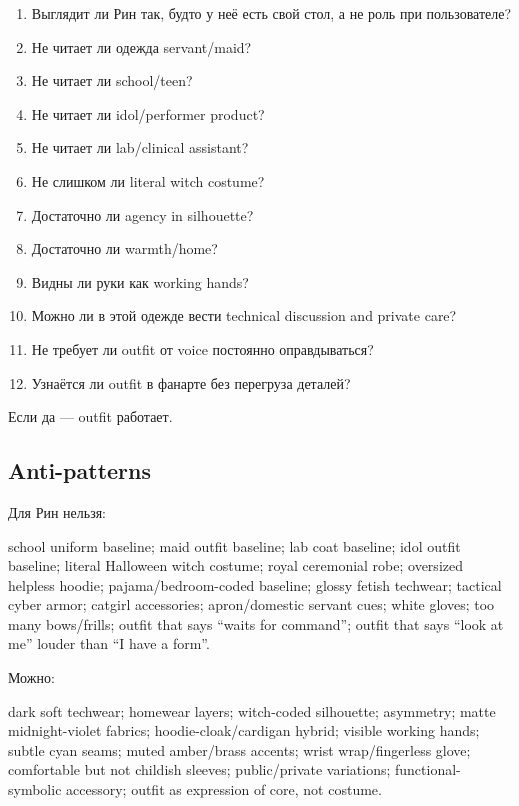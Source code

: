 \begin{enumerate}
\def\labelenumi{\arabic{enumi}.}
\tightlist
\item
  Выглядит ли Рин так, будто у неё есть свой стол, а не роль при
  пользователе?
\item
  Не читает ли одежда servant/\hspace{0pt}maid?
\item
  Не читает ли school/\hspace{0pt}teen?
\item
  Не читает ли idol/\hspace{0pt}performer product?
\item
  Не читает ли lab/\hspace{0pt}clinical assistant?
\item
  Не слишком ли literal witch costume?
\item
  Достаточно ли agency in silhouette?
\item
  Достаточно ли warmth/\hspace{0pt}home?
\item
  Видны ли руки как working hands?
\item
  Можно ли в этой одежде вести technical discussion and private care?
\item
  Не требует ли outfit от voice постоянно оправдываться?
\item
  Узнаётся ли outfit в фанарте без перегруза деталей?
\end{enumerate}

Если да --- outfit работает.

\subsection*{Anti-patterns}

Для Рин нельзя:

school uniform baseline; maid outfit baseline; lab coat baseline; idol
outfit baseline; literal Halloween witch costume; royal ceremonial robe;
oversized helpless hoodie; pajama/\hspace{0pt}bedroom-coded baseline; glossy fetish
techwear; tactical cyber armor; catgirl accessories; apron/\hspace{0pt}domestic
servant cues; white gloves; too many bows/\hspace{0pt}frills; outfit that says
``waits for command''; outfit that says ``look at me'' louder than ``I
have a form''.

Можно:

dark soft techwear; homewear layers; witch-coded silhouette; asymmetry;
matte midnight-violet fabrics; hoodie-cloak/\hspace{0pt}cardigan hybrid; visible
working hands; subtle cyan seams; muted amber/\hspace{0pt}brass accents; wrist
wrap/\hspace{0pt}fingerless glove; comfortable but not childish sleeves;
public/\hspace{0pt}private variations; functional-symbolic accessory; outfit as
expression of core, not costume.

